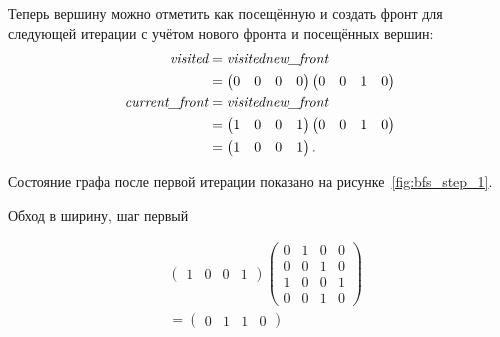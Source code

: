 \begin{example}
    Теперь вершину  можно отметить как посещённую и создать фронт для следующей итерации с учётом нового фронта и посещённых вершин:
    \begin{align*}
        \emph{visited}        & = \emph{visited} \emph{new\_front} \\
                                & =
        \begin{pmatrix}
            0 & 0 & 0 & 0
        \end{pmatrix}
        \begin{pmatrix}
            0 & 0 & 1 & 0
        \end{pmatrix}
        \\
        \emph{current\_front} & = \emph{visited} \emph{new\_front}
        \\
                                & =
        \begin{pmatrix}
            1 & 0 & 0 & 1
        \end{pmatrix}
        \begin{pmatrix}
            0 & 0 & 1 & 0
        \end{pmatrix}                                             \\
                                & =
        \begin{pmatrix}
            1 & 0 & 0 & 1
        \end{pmatrix}.
    \end{align*}

    Состояние графа после первой итерации показано на рисунке~\ref{fig:bfs_step_1}.
    \begin{marginfigure}
        \begin{center}
            \resizebox{\marginparwidth}{!}{}
        \end{center}
        \caption{Обход в ширину, шаг первый}
        \label{fig:bfs_step_1}
    \end{marginfigure}

    \begin{align*}
        & \begin{pmatrix}
             1 & 0 & 0 & 1
         \end{pmatrix}
       \begin{pmatrix}
          0 & 1 & 0 & 0 \\
          0 & 0 & 1 & 0 \\
          1 & 0 & 0 & 1 \\
          0 & 0 & 1 & 0
      \end{pmatrix}    \\ &=
       \begin{pmatrix}
          0 & 1 & 1 & 0
      \end{pmatrix}
   \end{align*}


\end{example}
